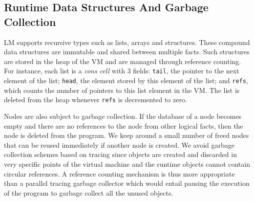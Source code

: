 \subsection{Runtime Data Structures And Garbage Collection}

LM supports recursive types such as lists, arrays and structures. These compound
data structures are immutable and shared between multiple facts. Such structures
are stored in the heap of the VM and are managed through reference counting. For
instance, each list is a \emph{cons cell} with 3 fields: \texttt{tail}, the
pointer to the next element of the list; \texttt{head}, the element stored by
this element of the list; and \texttt{refs}, which counts the number of pointers
to this list element in the VM. The list is deleted from the heap whenever
\texttt{refs} is decremented to zero.

Nodes are also subject to garbage collection. If the database of a node becomes
empty and there are no references to the node from other logical facts, then the
node is deleted from the program. We keep around a small number of freed nodes
that can be reused immediately if another node is created.  We avoid garbage
collection schemes based on tracing since objects are created and discarded in
very specific points of the virtual machine and the runtime objects cannot
contain circular references. A reference counting mechanism is thus more
appropriate than a parallel tracing garbage collector which would entail pausing
the execution of the program to garbage collect all the unused objects.
